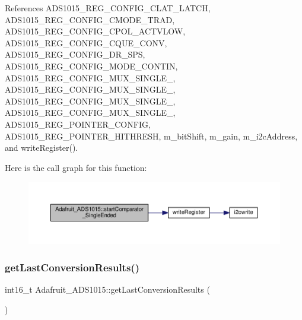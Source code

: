 References A\+D\+S1015\+\_\+\+R\+E\+G\+\_\+\+C\+O\+N\+F\+I\+G\+\_\+\+C\+L\+A\+T\+\_\+\+L\+A\+T\+CH, A\+D\+S1015\+\_\+\+R\+E\+G\+\_\+\+C\+O\+N\+F\+I\+G\+\_\+\+C\+M\+O\+D\+E\+\_\+\+T\+R\+AD, A\+D\+S1015\+\_\+\+R\+E\+G\+\_\+\+C\+O\+N\+F\+I\+G\+\_\+\+C\+P\+O\+L\+\_\+\+A\+C\+T\+V\+L\+OW, A\+D\+S1015\+\_\+\+R\+E\+G\+\_\+\+C\+O\+N\+F\+I\+G\+\_\+\+C\+Q\+U\+E\+\_\+C\+O\+NV, A\+D\+S1015\+\_\+\+R\+E\+G\+\_\+\+C\+O\+N\+F\+I\+G\+\_\+\+D\+R\+\_\+S\+PS, A\+D\+S1015\+\_\+\+R\+E\+G\+\_\+\+C\+O\+N\+F\+I\+G\+\_\+\+M\+O\+D\+E\+\_\+\+C\+O\+N\+T\+IN, A\+D\+S1015\+\_\+\+R\+E\+G\+\_\+\+C\+O\+N\+F\+I\+G\+\_\+\+M\+U\+X\+\_\+\+S\+I\+N\+G\+L\+E\+\_, A\+D\+S1015\+\_\+\+R\+E\+G\+\_\+\+C\+O\+N\+F\+I\+G\+\_\+\+M\+U\+X\+\_\+\+S\+I\+N\+G\+L\+E\+\_, A\+D\+S1015\+\_\+\+R\+E\+G\+\_\+\+C\+O\+N\+F\+I\+G\+\_\+\+M\+U\+X\+\_\+\+S\+I\+N\+G\+L\+E\+\_, A\+D\+S1015\+\_\+\+R\+E\+G\+\_\+\+C\+O\+N\+F\+I\+G\+\_\+\+M\+U\+X\+\_\+\+S\+I\+N\+G\+L\+E\+\_, A\+D\+S1015\+\_\+\+R\+E\+G\+\_\+\+P\+O\+I\+N\+T\+E\+R\+\_\+\+C\+O\+N\+F\+IG, A\+D\+S1015\+\_\+\+R\+E\+G\+\_\+\+P\+O\+I\+N\+T\+E\+R\+\_\+\+H\+I\+T\+H\+R\+E\+SH, m\+\_\+bit\+Shift, m\+\_\+gain, m\+\_\+i2c\+Address, and write\+Register().

Here is the call graph for this function\+:
\nopagebreak
\begin{figure}[H]
\begin{center}
\leavevmode
\includegraphics[width=350pt]{df/df6/class_adafruit___a_d_s1015_aecd30775d943ea9d9cff0e3485926596_cgraph}
\end{center}
\end{figure}
\mbox{\label{class_adafruit___a_d_s1015_ad8f36d80847020778425107f6451a8c2}} 
\subsubsection{\texorpdfstring{get\+Last\+Conversion\+Results()}{getLastConversionResults()}}
{\footnotesize\ttfamily int16\+\_\+t Adafruit\+\_\+\+A\+D\+S1015\+::get\+Last\+Conversion\+Results (\begin{DoxyParamCaption}{ }\end{DoxyParamCaption})}



